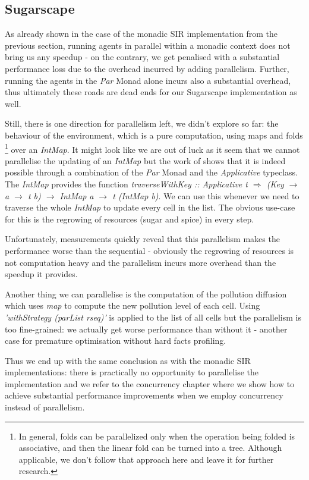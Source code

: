 \subsection{Sugarscape}
As already shown in the case of the monadic SIR implementation from the previous section, running agents in parallel within a monadic context does not bring us any speedup - on the contrary, we get penalised with a substantial performance loss due to the overhead incurred by adding parallelism. Further, running the agents in the \textit{Par} Monad alone incurs also a substantial overhead, thus ultimately these roads are dead ends for our Sugarscape implementation as well.

Still, there is one direction for parallelism left, we didn't explore so far: the behaviour of the environment, which is a pure computation, using maps and folds \footnote{In general, folds can be parallelized only when the operation being folded is associative, and then the linear fold can be turned into a tree. Although applicable, we don't follow that approach here and leave it for further research.} over an \textit{IntMap}. It might look like we are out of luck as it seem that we cannot parallelise the updating of an \textit{IntMap} but the work of \cite{marlow_parallel_2013} shows that it is indeed possible through a combination of the \textit{Par} Monad and the \textit{Applicative} typeclass. The \textit{IntMap} provides the function \textit{traverseWithKey :: Applicative t $\Rightarrow$ (Key $\rightarrow$ a $\rightarrow$ t b) $\rightarrow$ IntMap a $\rightarrow$ t (IntMap b)}. We can use this whenever we need to traverse the whole \textit{IntMap} to update every cell in the list. The obvious use-case for this is the regrowing of resources (sugar and spice) in every step.

Unfortunately, measurements quickly reveal that this parallelism makes the performance worse than the sequential - obviously the regrowing of resources is not computation heavy and the parallelism incurs more overhead than the speedup it provides.

Another thing we can parallelise is the computation of the pollution diffusion which uses \textit{map} to compute the new pollution level of each cell. Using \textit{'withStrategy (parList rseq)'} is applied to the list of all cells but the parallelism is too fine-grained: we actually get worse performance than without it - another case for premature optimisation without hard facts profiling.

Thus we end up with the same conclusion as with the monadic SIR implementations: there is practically no opportunity to parallelise the implementation and we refer to the concurrency chapter where we show how to achieve substantial performance improvements when we employ concurrency instead of parallelism.